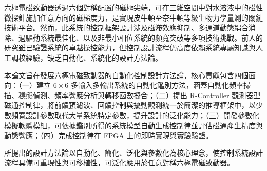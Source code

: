 \begin{abstractzh}
\setcounter{page}{1}

六極電磁致動器透過六個對稱配置的磁極尖端，可在三維空間中對水溶液中的磁性微探針施加任意方向的磁梯度力，是實現皮牛頓至奈牛頓等級生物力學量測的關鍵技術平台。然而，此系統的控制框架設計涉及磁滯效應抑制、多通道動態耦合消除、過驅動系統最佳化、以及非最小相位系統的頻寬突破等多項技術挑戰。前人的研究雖已驗證系統的卓越操控能力，但控制設計流程仍高度依賴系統專屬知識與人工調校經驗，缺乏自動化、系統化的設計方法論。

本論文旨在發展六極電磁致動器的自動化控制設計方法論，核心貢獻包含四個面向：（一）建立 $6\times6$ 多輸入多輸出系統的自動化鑑別方法，涵蓋自動化頻率掃描、穩態偵測、頻率響應分析與轉移函數擬合；（二）提出 R-Controller 觀測器型磁通控制律，將前饋預濾波、回饋控制與擾動觀測統一於簡潔的推導框架中，以少數頻寬設計參數取代大量系統特定參數，提升設計的泛化能力；（三）開發參數化模擬軟體模組，可依據鑑別所得的系統模型自動生成控制律並評估磁通產生精度與動態響應；（四）完成控制律在 FPGA 上的即時實現與實驗驗證。

所提出的設計方法論以自動化、簡化、泛化與參數化為核心理念，使控制系統設計流程具備可重現性與可移植性，可泛化應用於任意對稱六極電磁致動器。


\end{abstractzh}


